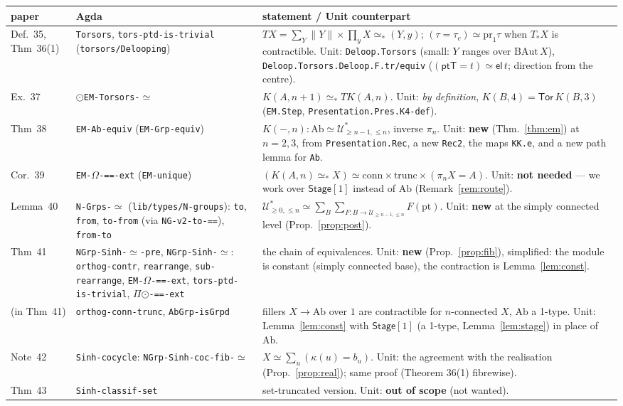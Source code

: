 \documentclass[11pt]{amsart}
\theoremstyle{definition}
\theoremstyle{remark}
\newcommand{\code}[1]{\texttt{#1}}
\newcommand{\el}{\mathsf{el}}
\newcommand{\tr}[1]{\|#1\|}
\newcommand{\Ab}{\mathrm{Ab}}
\newcommand{\St}{\mathsf{Stage}}
\newcommand{\Tor}{\mathsf{Tor}}
\newcommand{\pteq}{\simeq_*}
\newcommand{\U}{\mathcal{U}}
\begin{document}
\begin{longtable}{p{}p{}p{}}
\textbf{paper} & \textbf{Agda} & \textbf{statement / Unit counterpart} \\ \hline
Def.~35, Thm~36(1) & \code{Torsors}, \code{tors-ptd-is-trivial} (\code{torsors/Delooping})
 & $T X=\sum_Y \tr Y\times\prod_y X\pteq(Y,y)$; $(\tau=\tau_c)\simeq\mathrm{pr}_1\tau$ when $T_*X$ is contractible.
 Unit: \code{Deloop.Torsors} (small: $Y$ ranges over $\mathrm{BAut}\,X$), \code{Deloop.Torsors.Deloop.F.tr/equiv}
 ($(\mathsf{ptT}=t)\simeq\el\,t$; direction from the centre). \\
Ex.~37 & \code{\ensuremath{\odot}EM-Torsors-\ensuremath{\simeq}}
 & $K(A,n{+}1)\pteq T K(A,n)$. Unit: \emph{by definition}, $K(B,4)=\Tor\,K(B,3)$
 (\code{EM.Step}, \code{Presentation.Pres.K4-def}). \\
Thm~38 & \code{EM-Ab-equiv} (\code{EM-Grp-equiv})
 & $K(-,n):\Ab\simeq\U^*_{\ge n-1,\le n}$, inverse $\pi_n$. Unit: \textbf{new}
 (Thm.~\ref{thm:em}) at $n=2,3$, from \code{Presentation.Rec}, a new \code{Rec2},
 the maps \code{KK.e}, and a new path lemma for \code{Ab}. \\
Cor.~39 & \code{EM-\ensuremath{\Omega}-==-ext} (\code{EM-unique})
 & $(K(A,n)\pteq X)\simeq \text{conn}\times\text{trunc}\times(\pi_nX=A)$. Unit:
 \textbf{not needed} — we work over $\St[1]$ instead of $\Ab$ (Remark~\ref{rem:route}). \\
Lemma~40 & \code{N-Grps-\ensuremath{\simeq}} (\code{lib/types/N-groups}): \code{to}, \code{from}, \code{to-from} (via \code{NG-v2-to-==}), \code{from-to}
 & $\U^*_{\ge0,\le n}\simeq\sum_{B}\sum_{F:B\to\U_{\ge n-1,\le n}}F(\mathrm{pt})$.
 Unit: \textbf{new} at the simply connected level (Prop.~\ref{prop:post}). \\
Thm~41 & \code{NGrp-Sinh-\ensuremath{\simeq}-pre}, \code{NGrp-Sinh-\ensuremath{\simeq}}: \code{orthog-contr}, \code{rearrange},
 \code{sub-rearrange}, \code{EM-\ensuremath{\Omega}-==-ext}, \code{tors-ptd-is-trivial}, \code{\ensuremath{\Pi}\ensuremath{\odot}-==-ext}
 & the chain of equivalences. Unit: \textbf{new} (Prop.~\ref{prop:fib}), simplified:
 the module is constant (simply connected base), the contraction is Lemma~\ref{lem:const}. \\
(in Thm~41) & \code{orthog-conn-trunc}, \code{AbGrp-isGrpd}
 & fillers $X\to\Ab$ over $1$ are contractible for $n$-connected $X$, $\Ab$ a 1-type.
 Unit: Lemma~\ref{lem:const} with $\St[1]$ (a 1-type, Lemma~\ref{lem:stage}) in place of $\Ab$. \\
Note~42 & \code{Sinh-cocycle}: \code{NGrp-Sinh-coc-fib-\ensuremath{\simeq}}
 & $X\simeq\sum_u(\kappa(u)=b_u)$. Unit: the agreement with the realisation
 (Prop.~\ref{prop:real}); same proof (Theorem 36(1) fibrewise). \\
Thm~43 & \code{Sinh-classif-set}
 & set-truncated version. Unit: \textbf{out of scope} (not wanted).
\end{longtable}
\end{document}
